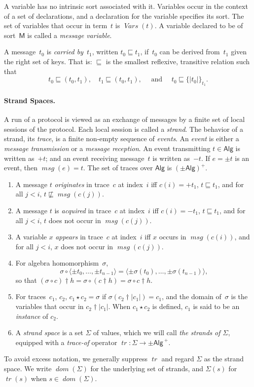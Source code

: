 \documentclass[12pt]{article}
\newcommand{\fn}[1]{\ensuremath{\operatorname{\mathit{#1}}}}
\newcommand{\sdom}{\fn{dom}}
\newcommand{\vars}{\fn{Vars}}
\newcommand{\seq}[1]{\ensuremath{\langle#1\rangle}}
\newcommand{\enc}[2]{\ensuremath{\{\!|#1|\!\}_{#2}}}
\newcommand{\inbnd}{\mathord -}
\newcommand{\outbnd}{\mathord +}
\newcommand{\srt}[1]{\ensuremath{\mathsf{#1}}}
\newcommand{\prefix}[2]{#1\dagger#2}
\newcommand{\inst}{\star}
\newcommand{\tr}{\ensuremath{{\pm\msg\,}^+}}
\newcommand{\length}[1]{\ensuremath{|#1|}}
\newcommand{\alg}[1]{\ensuremath{\mathsf{#1}}}
\newcommand{\msg}{\alg{Alg}}
\newcommand{\trace}{\fn{tr}}
\newcommand{\ssp}{\Sigma}
\newcommand{\nonatomic}{{message}}
\newcommand{\mess}{\fn{msg}}
\newcounter{running}[section]
\newenvironment{renumerate}{\begin{enumerate}%
\setcounter{enumi}{\value{running}}}%
{\setcounter{running}{\value{enumi}}\end{enumerate}}
\begin{document}
A variable has no intrinsic sort associated with it.  Variables occur
in the context of a set of declarations, and a declaration for the
variable specifies its sort.  The set of variables that occur in
term~$t$ is $\vars(t)$.  A variable declared to be of sort~\srt{M} is
called a \emph{{\nonatomic} variable}.

A message~$t_0$ is \emph{carried by}~$t_1$, written $t_0\sqsubseteq
t_1$, if~$t_0$ can be derived from~$t_1$ given the right set of keys.
That is:  $\sqsubseteq$ is the smallest reflexive, transitive relation
such that
%
$$t_0\sqsubseteq (t_0, t_1),\quad
t_1\sqsubseteq (t_0, t_1),\quad\mbox{ and }\quad
t_0\sqsubseteq\enc{t_0}{t_1}.$$

\paragraph{Strand Spaces.}
A run of a protocol is viewed as an exchange of messages by a finite
set of local sessions of the protocol.  Each local session is called a
\emph{strand}.  The behavior of a strand, its \emph{trace}, is a
finite non-empty sequence of \emph{events}.  An \emph{event} is either
a \emph{message transmission} or a \emph{message reception}.  An event
transmitting $t\in\msg$ is written as~$\outbnd t$; and an event
receiving message~$t$ is written as~$\inbnd t$.  If $e=\pm t$ is an
event, then $\mess(e)=t$.  The set of traces over $\msg$ is
$(\pm\msg)^+$.

\begin{renumerate}
  \item A message $t$ \emph{originates} in trace~$c$ at index~$i$ iff
  $c(i)=+t_1$, $t\sqsubseteq t_1$, and for all $j<i$,
  $t\not\sqsubseteq\mess(c(j))$.
  \item A message $t$ is \emph{acquired} in trace~$c$ at index~$i$ iff
  $c(i)=-t_1$, $t\sqsubseteq t_1$, and for all
  $j<i$, $t$ does not occur in $\mess(c(j))$.
  \item A variable $x$ \emph{appears} in trace~$c$ at index~$i$ iff
    $x$ occurs in $\mess(c(i))$, and for all $j<i$, $x$ does not occur
    in $\mess(c(j))$.
  \item For algebra homomorphism~$\sigma$,
%
  \[\sigma\circ\seq{\pm t_0,\ldots,\pm t_{n-1}}=
  \seq{\pm \sigma(t_0),\ldots,\pm \sigma(t_{n-1})},\]
%
  so that $\prefix{(\sigma\circ
    c)}{h}=\sigma\circ(\prefix{c}{h})=\sigma\circ\prefix{c}{h}$.
  \item For traces~$c_1$, $c_2$, $c_1\inst c_2=\sigma$ if
    $\sigma(\prefix{c_2}{\length{c_1}})=c_1$, and the domain
    of~$\sigma$ is the variables that occur in
    $\prefix{c_2}{\length{c_1}}$.  When $c_1\inst c_2$ is defined,
    $c_1$ is said to be an \emph{instance} of $c_2$.
  \item A \emph{strand space} is a set $\Sigma$ of values, which we
  will call \emph{the strands of $\Sigma$}, equipped with a
  \emph{trace-of} operator
  $\trace\colon\Sigma\rightarrow\tr$.
\end{renumerate}
%
To avoid excess notation, we generally suppress $\trace$ and regard
$\ssp$ as the strand space.  We write $\sdom(\ssp)$ for the underlying
set of strands, and $\ssp(s)$ for $\trace(s)$ when $s\in\sdom(\ssp)$.
\end{document}
